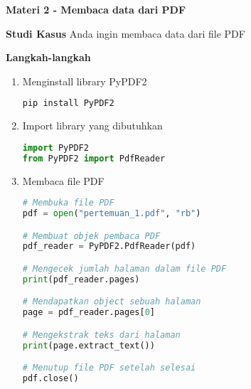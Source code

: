 \documentclass{article}
\begin{document}
    \begin{flushleft}
        \textbf{Materi 2 \@- Membaca data dari PDF}
        \newline

        \textbf{Studi Kasus}
        \newline
        Anda ingin membaca data dari file PDF
        \newline

        \textbf{Langkah-langkah}

        \begin{enumerate}
            \item Menginstall library PyPDF2
            \lstset{style=bashstyle}
            \begin{lstlisting}[language=bash]
pip install PyPDF2
            \end{lstlisting}

            \item Import library yang dibutuhkan
            \lstset{style=pythonstyle}
            \begin{lstlisting}[language=python]
import PyPDF2
from PyPDF2 import PdfReader
            \end{lstlisting}

            \item Membaca file PDF
            \lstset{style=pythonstyle}
            \begin{lstlisting}[language=python]
# Membuka file PDF
pdf = open("pertemuan_1.pdf", "rb")

# Membuat objek pembaca PDF
pdf_reader = PyPDF2.PdfReader(pdf)

# Mengecek jumlah halaman dalam file PDF
print(pdf_reader.pages)

# Mendapatkan object sebuah halaman
page = pdf_reader.pages[0]

# Mengekstrak teks dari halaman
print(page.extract_text())

# Menutup file PDF setelah selesai
pdf.close()
            \end{lstlisting}
        \end{enumerate}
    \end{flushleft}
\end{document}
